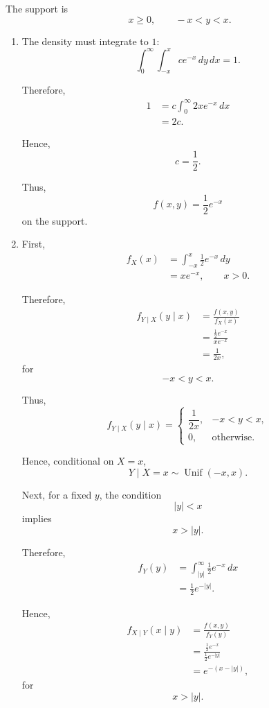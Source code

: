 \documentclass[11pt]{article}
\newenvironment{solution}{
    \par
    \begin{tcolorbox}[
        colback=white,
        colframe=uwgold,
        boxrule=0.7pt,
        arc=2mm,
        left=3mm,
        right=3mm,
        top=2mm,
        bottom=2mm,
        breakable,
        before skip=0.5em,
        after skip=1em,
        title=\textbf{Solution},
        coltitle=uwpurple,
        fonttitle=\bfseries
    ]
}{
    \end{tcolorbox}
}
\begin{document}
\begin{solution}

The support is
\[
x\geq0,
\qquad
-x<y<x.
\]

\begin{enumerate}[label=(\alph*)]

\item The density must integrate to \(1\):
\[
\int_0^\infty
\int_{-x}^{x}
ce^{-x}\,dy\,dx
=
1.
\]

Therefore,
\[
\begin{aligned}
1
&=
c\int_0^\infty
2xe^{-x}\,dx\\
&=
2c.
\end{aligned}
\]

Hence,
\[
c=\frac12.
\]

Thus,
\[
f(x,y)
=
\frac12e^{-x}
\]
on the support.

\item First,
\[
\begin{aligned}
f_X(x)
&=
\int_{-x}^{x}\frac12e^{-x}\,dy\\
&=
xe^{-x},
\qquad x>0.
\end{aligned}
\]

Therefore,
\[
\begin{aligned}
f_{Y\mid X}(y\mid x)
&=
\frac{f(x,y)}{f_X(x)}\\
&=
\frac{\frac12e^{-x}}{xe^{-x}}\\
&=
\frac1{2x},
\end{aligned}
\]
for
\[
-x<y<x.
\]

Thus,
\[
f_{Y\mid X}(y\mid x)
=
\begin{cases}
\dfrac1{2x}, & -x<y<x,\\[1mm]
0, & \text{otherwise}.
\end{cases}
\]

Hence, conditional on \(X=x\),
\[
Y\mid X=x
\sim
\operatorname{Unif}(-x,x).
\]

Next, for a fixed \(y\), the condition
\[
|y|<x
\]
implies
\[
x>|y|.
\]

Therefore,
\[
\begin{aligned}
f_Y(y)
&=
\int_{|y|}^{\infty}
\frac12e^{-x}\,dx\\
&=
\frac12e^{-|y|}.
\end{aligned}
\]

Hence,
\[
\begin{aligned}
f_{X\mid Y}(x\mid y)
&=
\frac{f(x,y)}{f_Y(y)}\\
&=
\frac{\frac12e^{-x}}
{\frac12e^{-|y|}}\\
&=
e^{-(x-|y|)},
\end{aligned}
\]
for
\[
x>|y|.
\]


\end{enumerate}
\end{solution}
\end{document}
